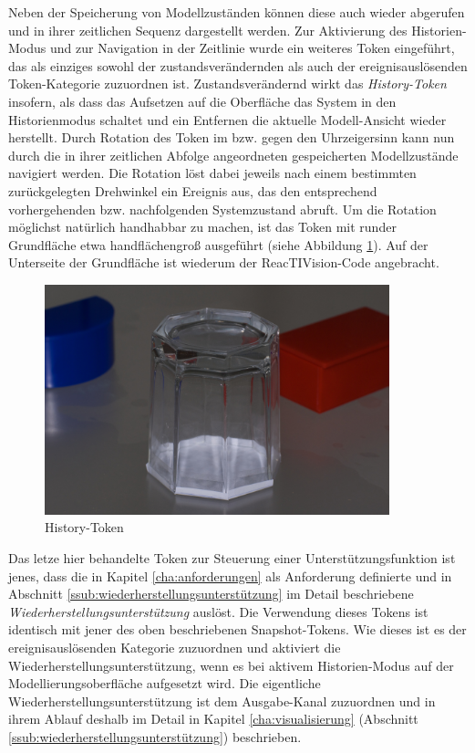 Neben der Speicherung von Modellzuständen können diese auch wieder abgerufen und in ihrer zeitlichen Sequenz dargestellt werden. Zur Aktivierung des Historien-Modus und zur Navigation in der Zeitlinie wurde ein weiteres Token eingeführt, das als einziges sowohl der zustandsverändernden als auch der ereignisauslösenden Token-Kategorie zuzuordnen ist. Zustandsverändernd wirkt das \emph{History-Token} insofern, als dass das Aufsetzen auf die Oberfläche das System in den Historienmodus schaltet und ein Entfernen die aktuelle Modell-Ansicht wieder herstellt. Durch Rotation des Token im bzw. gegen den Uhrzeigersinn kann nun durch die in ihrer zeitlichen Abfolge angeordneten gespeicherten Modellzustände navigiert werden. Die Rotation löst dabei jeweils nach einem bestimmten zurückgelegten Drehwinkel ein Ereignis aus, das den entsprechend vorhergehenden bzw. nachfolgenden Systemzustand abruft. Um die Rotation möglichst natürlich handhabbar zu machen, ist das Token mit runder Grundfläche etwa handflächengroß ausgeführt (siehe Abbildung \ref{fig:img_SystemNeu_Historytoken}). Auf der Unterseite der Grundfläche ist wiederum der ReacTIVision-Code angebracht.

\begin{figure}[htbp]
	\centering
		\includegraphics[width=10cm]{img/SystemNeu/Historytoken.jpg}
	\caption{History-Token}
	\label{fig:img_SystemNeu_Historytoken}
\end{figure}

Das letze hier behandelte Token zur Steuerung einer Unterstützungsfunktion ist jenes, dass die in Kapitel \ref{cha:anforderungen} als Anforderung definierte und in Abschnitt \ref{ssub:wiederherstellungsunterstützung} im Detail beschriebene \emph{Wiederherstellungsunterstützung} auslöst. Die Verwendung dieses Tokens ist identisch mit jener des oben beschriebenen Snapshot-Tokens. Wie dieses ist es der ereignisauslösenden Kategorie zuzuordnen und aktiviert die Wiederherstellungsunterstützung, wenn es bei aktivem Historien-Modus auf der Modellierungsoberfläche aufgesetzt wird. Die eigentliche Wiederherstellungsunterstützung ist dem Ausgabe-Kanal zuzuordnen und in ihrem Ablauf deshalb im Detail in Kapitel \ref{cha:visualisierung} (Abschnitt \ref{ssub:wiederherstellungsunterstützung}) beschrieben.


